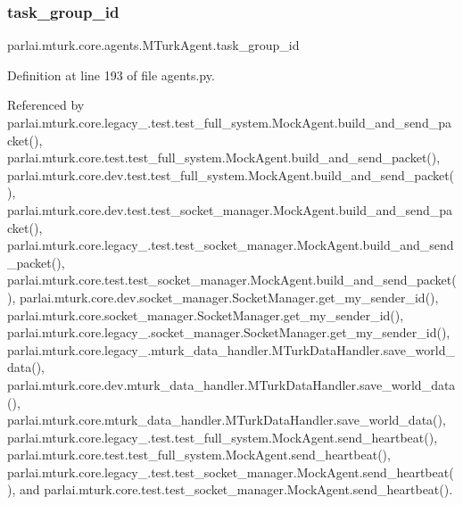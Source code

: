 \subsubsection{\texorpdfstring{task\+\_\+group\+\_\+id}{task\_group\_id}}
{\footnotesize\ttfamily parlai.\+mturk.\+core.\+agents.\+M\+Turk\+Agent.\+task\+\_\+group\+\_\+id}



Definition at line 193 of file agents.\+py.



Referenced by parlai.\+mturk.\+core.\+legacy\+\_.\+test.\+test\+\_\+full\+\_\+system.\+Mock\+Agent.\+build\+\_\+and\+\_\+send\+\_\+packet(), parlai.\+mturk.\+core.\+test.\+test\+\_\+full\+\_\+system.\+Mock\+Agent.\+build\+\_\+and\+\_\+send\+\_\+packet(), parlai.\+mturk.\+core.\+dev.\+test.\+test\+\_\+full\+\_\+system.\+Mock\+Agent.\+build\+\_\+and\+\_\+send\+\_\+packet(), parlai.\+mturk.\+core.\+dev.\+test.\+test\+\_\+socket\+\_\+manager.\+Mock\+Agent.\+build\+\_\+and\+\_\+send\+\_\+packet(), parlai.\+mturk.\+core.\+legacy\+\_.\+test.\+test\+\_\+socket\+\_\+manager.\+Mock\+Agent.\+build\+\_\+and\+\_\+send\+\_\+packet(), parlai.\+mturk.\+core.\+test.\+test\+\_\+socket\+\_\+manager.\+Mock\+Agent.\+build\+\_\+and\+\_\+send\+\_\+packet(), parlai.\+mturk.\+core.\+dev.\+socket\+\_\+manager.\+Socket\+Manager.\+get\+\_\+my\+\_\+sender\+\_\+id(), parlai.\+mturk.\+core.\+socket\+\_\+manager.\+Socket\+Manager.\+get\+\_\+my\+\_\+sender\+\_\+id(), parlai.\+mturk.\+core.\+legacy\+\_.\+socket\+\_\+manager.\+Socket\+Manager.\+get\+\_\+my\+\_\+sender\+\_\+id(), parlai.\+mturk.\+core.\+legacy\+\_.\+mturk\+\_\+data\+\_\+handler.\+M\+Turk\+Data\+Handler.\+save\+\_\+world\+\_\+data(), parlai.\+mturk.\+core.\+dev.\+mturk\+\_\+data\+\_\+handler.\+M\+Turk\+Data\+Handler.\+save\+\_\+world\+\_\+data(), parlai.\+mturk.\+core.\+mturk\+\_\+data\+\_\+handler.\+M\+Turk\+Data\+Handler.\+save\+\_\+world\+\_\+data(), parlai.\+mturk.\+core.\+legacy\+\_.\+test.\+test\+\_\+full\+\_\+system.\+Mock\+Agent.\+send\+\_\+heartbeat(), parlai.\+mturk.\+core.\+test.\+test\+\_\+full\+\_\+system.\+Mock\+Agent.\+send\+\_\+heartbeat(), parlai.\+mturk.\+core.\+legacy\+\_.\+test.\+test\+\_\+socket\+\_\+manager.\+Mock\+Agent.\+send\+\_\+heartbeat(), and parlai.\+mturk.\+core.\+test.\+test\+\_\+socket\+\_\+manager.\+Mock\+Agent.\+send\+\_\+heartbeat().

\mbox{\label{classparlai_1_1mturk_1_1core_1_1agents_1_1MTurkAgent_a3e24e99c772d13e949f46ac35def1b96}} 
